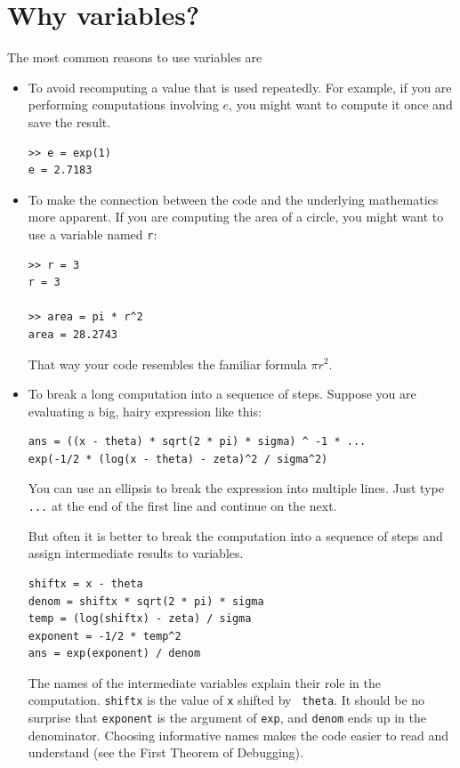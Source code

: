 \documentclass[
]{book}
\begin{document}
\section{Why variables?}

The most common reasons to use variables are

\begin{itemize}

\item To avoid recomputing a value that is used repeatedly.  For
example, if you are performing computations involving $e$, you might
want to compute it once and save the result.

\begin{verbatim}
>> e = exp(1)
e = 2.7183
\end{verbatim}


\item To make the connection between the code and the underlying
mathematics more apparent.  If you are computing the area of a circle,
you might want to use a variable named {\tt r}:

\begin{verbatim}
>> r = 3
r = 3

>> area = pi * r^2
area = 28.2743
\end{verbatim}

That way your code resembles the familiar formula $\pi r^2$.

\item To break a long computation into a sequence of steps.
Suppose you are evaluating a big, hairy expression like this:

\begin{verbatim}
ans = ((x - theta) * sqrt(2 * pi) * sigma) ^ -1 * ...
exp(-1/2 * (log(x - theta) - zeta)^2 / sigma^2)
\end{verbatim}

You can use an ellipsis to break the expression into multiple lines.
Just type {\tt ...} at the end of the first line and continue on the
next.

But often it is better to break the computation into a sequence of
steps and assign intermediate results to variables.

\begin{verbatim}
shiftx = x - theta
denom = shiftx * sqrt(2 * pi) * sigma
temp = (log(shiftx) - zeta) / sigma
exponent = -1/2 * temp^2
ans = exp(exponent) / denom
\end{verbatim}

The names of the intermediate variables explain their role in the
computation.  {\tt shiftx} is the value of {\tt x} shifted by {\tt
theta}.  It should be no surprise that {\tt exponent} is the argument
of {\tt exp}, and {\tt denom} ends up in the denominator.  Choosing
informative names makes the code easier to read and understand (see
the First Theorem of Debugging).

\end{itemize}
\end{document}
